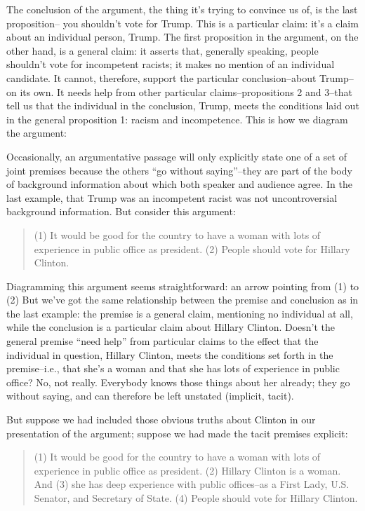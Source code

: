 The conclusion of the argument, the thing it's trying to convince us of, is the last proposition--
you shouldn't vote for Trump. This is a particular claim: it's a claim about an individual person,
Trump. The first proposition in the argument, on the other hand, is a general claim: it asserts that,
generally speaking, people shouldn't vote for incompetent racists; it makes no mention of an
individual candidate. It cannot, therefore, support the particular conclusion--about Trump--on its
own. It needs help from other particular claims--propositions 2 and 3--that tell us that the
individual in the conclusion, Trump, meets the conditions laid out in the general proposition 1:
racism and incompetence. This is how we diagram the argument:



Occasionally, an argumentative passage will only explicitly state one of a set of joint premises
because the others ``go without saying''--they are part of the body of background information
about which both speaker and audience agree. In the last example, that Trump was an incompetent
racist was not uncontroversial background information. But consider this argument:

\begin{quotation}
(1) It would be good for the country to have a woman with lots of experience in public
office as president. (2) People should vote for Hillary Clinton.
\end{quotation}

Diagramming this argument seems straightforward: an arrow pointing from (1) to (2) But we've
got the same relationship between the premise and conclusion as in the last example: the premise
is a general claim, mentioning no individual at all, while the conclusion is a particular claim about
Hillary Clinton. Doesn't the general premise ``need help'' from particular claims to the effect that
the individual in question, Hillary Clinton, meets the conditions set forth in the premise--i.e., that
she's a woman and that she has lots of experience in public office? No, not really. Everybody
knows those things about her already; they go without saying, and can therefore be left unstated
(implicit, tacit).

But suppose we had included those obvious truths about Clinton in our presentation of the
argument; suppose we had made the tacit premises explicit:

\begin{quotation}
(1) It would be good for the country to have a woman with lots of experience in public
office as president. (2) Hillary Clinton is a woman. And (3) she has deep experience with
public offices--as a First Lady, U.S. Senator, and Secretary of State. (4) People should vote
for Hillary Clinton.
\end{quotation}

